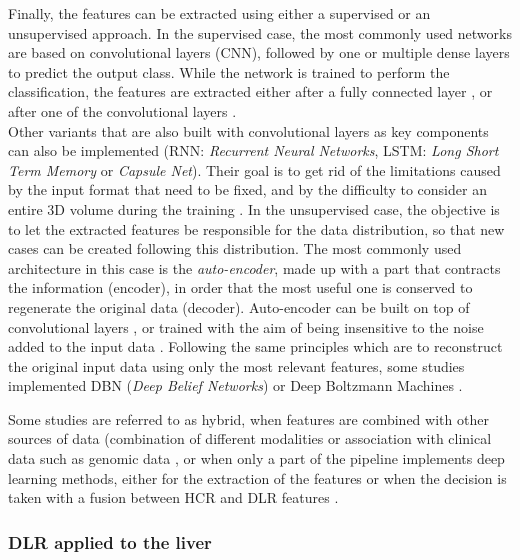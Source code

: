 \documentclass[]{article}
\begin{document}
Finally, the features can be extracted using either a supervised or an
unsupervised approach. In the supervised case, the most commonly used
networks are based on convolutional layers (CNN), followed by one
or multiple dense layers to predict the output class. While the network
is trained to perform the classification, the features are extracted
either after a fully connected layer \cite{Paul2016}, or after one of the convolutional layers \cite{Li2017}.\\
Other variants that are also built with convolutional layers as key
components can also be implemented (RNN: \emph{Recurrent Neural Networks}, LSTM: \emph{Long Short Term Memory} or
\emph{Capsule Net}). Their goal is to get rid of the limitations caused
by the input format that need to be fixed, and by the difficulty to
consider an entire 3D volume during the training \cite{Azizi2018}.
In the unsupervised case, the objective is to let the extracted features
be responsible for the data distribution, so that new cases can be
created following this distribution. The most commonly used architecture
in this case is the \emph{auto-encoder}, made up with a part that
contracts the information (encoder), in order that the most useful one
is conserved to regenerate the original data (decoder). Auto-encoder can
be built on top of convolutional layers \cite{Echaniz2017}, or trained with the aim of being insensitive to the noise
added to the input data \cite{Sun2017a,Kim2016}. Following the same principles which are to reconstruct the
original input data using only the most relevant features, some studies
implemented DBN (\emph{Deep Belief Networks}) \cite{Sun2017a} or Deep Boltzmann Machines \cite{Suk2014}.

Some studies are referred to as hybrid, when features are combined with
other sources of data (combination of different modalities \cite{Oikonomou2018} or association with clinical
data such as genomic data \cite{Emaminejad2016}, or
when only a part of the pipeline implements deep learning methods,
either for the extraction of the features \cite{Paul2016} or when the decision is taken with a fusion between HCR
and DLR features \cite{Huynh2016}.

\subsubsection{DLR applied to the liver}\label{dlr-applied-to-the-liver}
\end{document}
